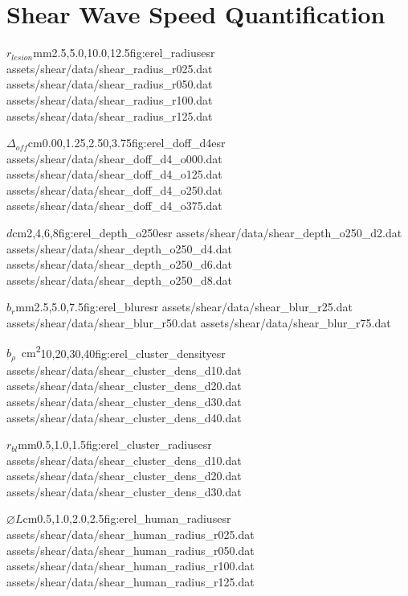 	\section{Shear Wave Speed Quantification}
	\label{appsec:dt_shear}
		\begin{multicols*}{2}
			\characterizationDataTable%
				{$r_{lesion}$}{mm}{2.5,5.0,10.0,12.5}{fig:erel_radius}{esr}%
				{assets/shear/data/shear_radius_r025.dat}%
				{assets/shear/data/shear_radius_r050.dat}%
				{assets/shear/data/shear_radius_r100.dat}%
				{assets/shear/data/shear_radius_r125.dat}

			\characterizationDataTable%
				{$\Delta_{off}$}{cm}{0.00,1.25,2.50,3.75}{fig:erel_doff_d4}{esr}%
				{assets/shear/data/shear_doff_d4_o000.dat}%
				{assets/shear/data/shear_doff_d4_o125.dat}%
				{assets/shear/data/shear_doff_d4_o250.dat}%
				{assets/shear/data/shear_doff_d4_o375.dat}

			\characterizationDataTable%
				{$d$}{cm}{2,4,6,8}{fig:erel_depth_o250}{esr}%
				{assets/shear/data/shear_depth_o250_d2.dat}%
				{assets/shear/data/shear_depth_o250_d4.dat}%
				{assets/shear/data/shear_depth_o250_d6.dat}%
				{assets/shear/data/shear_depth_o250_d8.dat}

			\characterizationDataTable%
				{$b_r$}{mm}{2.5,5.0,7.5}{fig:erel_blur}{esr}%
				{assets/shear/data/shear_blur_r25.dat}%
				{assets/shear/data/shear_blur_r50.dat}%
				{assets/shear/data/shear_blur_r75.dat}%
				{}

			\characterizationDataTable%
				{$b_\rho$}{\si{\per\cm\squared}}{10,20,30,40}{fig:erel_cluster_density}{esr}%
				{assets/shear/data/shear_cluster_dens_d10.dat}%
				{assets/shear/data/shear_cluster_dens_d20.dat}%
				{assets/shear/data/shear_cluster_dens_d30.dat}%
				{assets/shear/data/shear_cluster_dens_d40.dat}

			\characterizationDataTable%
				{$r_{bl}$}{mm}{0.5,1.0,1.5}{fig:erel_cluster_radius}{esr}%
				{assets/shear/data/shear_cluster_dens_d10.dat}%
				{assets/shear/data/shear_cluster_dens_d20.dat}%
				{assets/shear/data/shear_cluster_dens_d30.dat}%
				{}

			\characterizationDataTable%
				{$\diameter L$}{cm}{0.5,1.0,2.0,2.5}{fig:erel_human_radius}{esr}%
				{assets/shear/data/shear_human_radius_r025.dat}%
				{assets/shear/data/shear_human_radius_r050.dat}%
				{assets/shear/data/shear_human_radius_r100.dat}%
				{assets/shear/data/shear_human_radius_r125.dat}
		\end{multicols*}